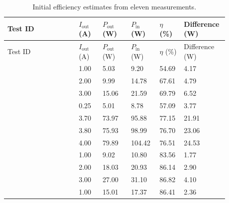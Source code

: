 \begingroup
\scriptsize
\setlength{\tabcolsep}{3pt}
\renewcommand{\arraystretch}{1.12}
\begin{longtable}{@{}L{0.3022\linewidth} L{0.1067\linewidth} L{0.1244\linewidth} L{0.1244\linewidth} L{0.0978\linewidth} L{0.1244\linewidth}@{}}
\caption{Initial efficiency estimates from eleven measurements.}\label{tab:efficiency-results}\\
\toprule
Test ID & $I_\mathrm{out}$ (A) & $P_\mathrm{out}$ (W) & $P_\mathrm{in}$ (W) & $\eta$ (\%) & Difference (W)\\
\midrule
\endfirsthead
\toprule
Test ID & $I_\mathrm{out}$ (A) & $P_\mathrm{out}$ (W) & $P_\mathrm{in}$ (W) & $\eta$ (\%) & Difference (W)\\
\midrule
\endhead
{} & 1.00 & 5.03 & 9.20 & 54.69 & 4.17\\
 & 2.00 & 9.99 & 14.78 & 67.61 & 4.79\\
 & 3.00 & 15.06 & 21.59 & 69.79 & 6.52\\
 & 0.25 & 5.01 & 8.78 & 57.09 & 3.77\\
 & 3.70 & 73.97 & 95.88 & 77.15 & 21.91\\
 & 3.80 & 75.93 & 98.99 & 76.70 & 23.06\\
 & 4.00 & 79.89 & 104.42 & 76.51 & 24.53\\
 & 1.00 & 9.02 & 10.80 & 83.56 & 1.77\\
 & 2.00 & 18.03 & 20.93 & 86.14 & 2.90\\
 & 3.00 & 27.00 & 31.10 & 86.82 & 4.10\\
 & 1.00 & 15.01 & 17.37 & 86.41 & 2.36\\
\bottomrule
\end{longtable}
\endgroup
